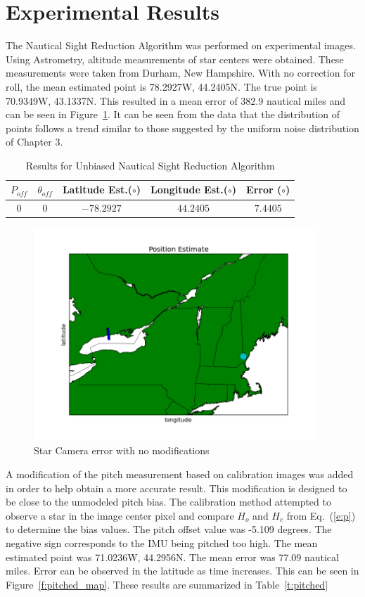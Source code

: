 \documentclass[12pt,a4paper]{book}
\begin{document}
\section{Experimental Results}
The Nautical Sight Reduction Algorithm was performed on experimental images.  Using Astrometry, altitude measurements of star centers were obtained.  These measurements were taken from Durham, New Hampshire.  With no correction for roll, the mean estimated point is 78.2927W, 44.2405N.  The true point is 70.9349W, 43.1337N.  This resulted in a mean error of 382.9 nautical miles and can be seen in Figure~\ref{f:nomods}. It can be seen from the data that the distribution of points follows a trend similar to those suggested by the uniform noise distribution of Chapter 3. 
\FloatBarrier
\begin{table}[ht!]
\centering
\begin{tabular}{ |c|c|c|c|c| } 
 \hline
 $P_{off}$ & $\theta_{off}$ & Latitude Est.($\circ$) & Longitude Est.($\circ$)&Error ($\circ$) \\ 
 \hline
 $0$ & $0$ & $-78.2927$ & $44.2405$ &$7.4405$   \\ 
 \hline
\end{tabular}
\caption{Results for Unbiased Nautical Sight Reduction Algorithm}
\label{t:nomods}
\end{table}
\begin{figure}[!ht]
\centering
\includegraphics[height=8cm]{nomods.png}
\caption{Star Camera error with no modifications}
\label{f:nomods}
\end{figure}
\FloatBarrier
A modification of the pitch measurement based on calibration images was added in order to help obtain a more accurate result.  This modification is designed to be close to the unmodeled pitch bias.  The calibration  method attempted to observe a star in the image center pixel and compare $H_{o}$ and $H_{c}$ from Eq.~(\ref{e:p}) to determine the bias values. The pitch offset value was -5.109 degrees. The negative sign corresponds to the IMU being pitched too high. The mean estimated point was 71.0236W, 44.2956N.  The mean error was 77.09 nautical miles.  Error can be observed in the latitude as time increases.  This can be seen in Figure~\ref{f:pitched_map}.  These results are summarized in Table~\ref{t:pitched}
\end{document}
